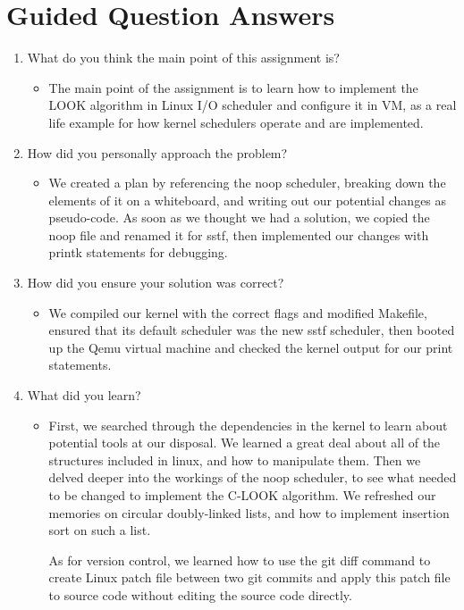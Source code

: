 \documentclass[10pt,draftclsnofoot,onecolumn]{IEEEtran}
\begin{document}
    \section{Guided Question Answers}
    \begin{enumerate}
    	\item What do you think the main point of this assignment is?
    	\begin{itemize}
    		\item The main point of the assignment is to learn how to implement the LOOK algorithm in Linux I/O scheduler and configure it in VM, as a real life example for how kernel schedulers operate and are implemented.
        \end{itemize}
        \item How did you personally approach the problem?
        \begin{itemize}
        	\item We created a plan by referencing the noop scheduler, breaking down the elements of it on a whiteboard, and writing out our potential changes as pseudo-code. As soon as we thought we had a solution, we copied the noop file and renamed it for sstf, then implemented our changes with printk statements for debugging.
        \end{itemize}
        \item How did you ensure your solution was correct?
        \begin{itemize}
        	\item We compiled our kernel with the correct flags and modified Makefile, ensured that its default scheduler was the new sstf scheduler, then booted up the Qemu virtual machine and checked the kernel output for our print statements.
        \end{itemize}
        \item What did you learn?
        \begin{itemize}
        	\item First, we searched through the dependencies in the kernel to learn about potential tools at our disposal. We learned a great deal about all of the structures included in linux, and how to manipulate them. Then we delved deeper into the workings of the noop scheduler, to see what needed to be changed to implement the C-LOOK algorithm. We refreshed our memories on circular doubly-linked lists, and how to implement insertion sort on such a list.
           \par As for version control, we learned how to use the git diff command to create Linux patch file between two git commits and apply this patch file to source code without editing the source code directly. 

\end{itemize}
\end{enumerate}
\end{document}

